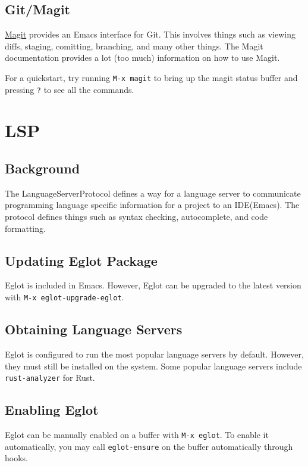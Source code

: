 \documentclass[11pt]{article}
\begin{document}
\subsection{Git/Magit}
\label{sec:orga01fff6}

\href{https://github.com/magit/magit/tree/e3806cbb7dd38ab73624ad48024998705f9d0d20}{Magit} provides an Emacs interface for Git. This involves things such as viewing
diffs, staging, comitting, branching, and many other things. The Magit
documentation provides a lot (too much) information on how to use Magit.

For a quickstart, try running \texttt{M-x magit} to bring up the magit status buffer
and pressing \texttt{?} to see all the commands.
\section{LSP}
\label{sec:org2ec4f94}

\subsection{Background}
\label{sec:orgf761b35}
The LanguageServerProtocol defines a way for a language server to communicate
programming language specific information for a project to an IDE(Emacs). The
protocol defines things such as syntax checking, autocomplete, and code
formatting.
\subsection{Updating Eglot Package}
\label{sec:orgcb381a8}

Eglot is included in Emacs. However, Eglot can be upgraded to the latest version
with \texttt{M-x eglot-upgrade-eglot}.
\subsection{Obtaining Language Servers}
\label{sec:org13578b8}

Eglot is configured to run the most popular language servers by
default. However, they must still be installed on the system. Some popular
language servers include \texttt{rust-analyzer} for Rust.
\subsection{Enabling Eglot}
\label{sec:org40d9a36}

Eglot can be manually enabled on a buffer with \texttt{M-x eglot}. To enable it
automatically, you may call \texttt{eglot-ensure} on the buffer automatically through
hooks.
\end{document}
